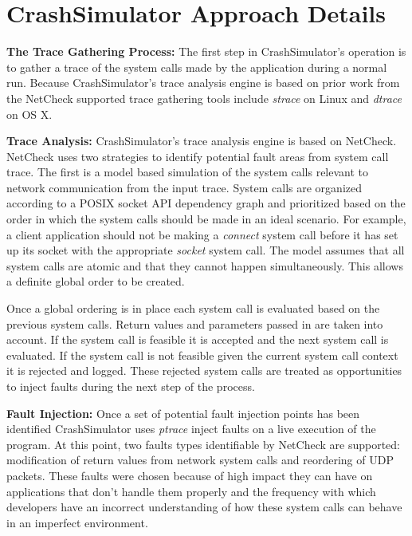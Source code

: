 \section{CrashSimulator Approach Details}

    \textbf{The Trace Gathering Process:} The first step in CrashSimulator's operation is to gather a trace of the
    system calls made by the application during a normal run. Because CrashSimulator's trace analysis engine is based on
    prior work from the NetCheck supported trace gathering tools include \emph{strace} on Linux and \emph{dtrace} on OS
    X.

    \textbf{Trace Analysis:} CrashSimulator's trace analysis engine is based on NetCheck. NetCheck uses two strategies
    to identify potential fault areas from system call trace. The first is a model based simulation of the system calls
    relevant to network communication from the input trace. System calls are organized according to a POSIX socket API
    dependency graph and prioritized based on the order in which the system calls should be made in an ideal scenario.
    For example, a client application should not be making a \emph{connect} system call before it has set up its
    socket with the appropriate \emph{socket} system call. The model assumes that all system calls are atomic and that
    they cannot happen simultaneously. This allows a definite global order to be created.

    Once a global ordering is in place each system call is evaluated based on the previous system calls. Return values
    and parameters passed in are taken into account. If the system call is feasible it is accepted and the next system
    call is evaluated. If the system call is not feasible given the current system call context it is rejected and
    logged. These rejected system calls are treated as opportunities to inject faults during the next step of the
    process.

    \textbf{Fault Injection:} Once a set of potential fault injection points has been identified CrashSimulator uses
    \emph{ptrace} inject faults on a live execution of the program. At this point, two faults types identifiable by
    NetCheck are supported: modification of return values from network system calls and reordering of UDP packets.
    These faults were chosen because of high impact they can have on applications that don't handle them properly and
    the frequency with which developers have an incorrect understanding of how these system calls can behave in an
    imperfect environment.

